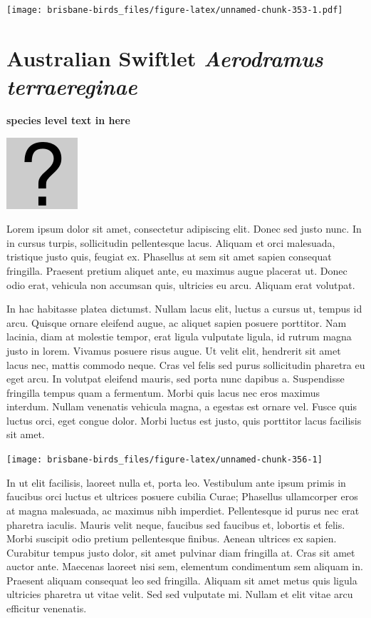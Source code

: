 \documentclass[]{book}
\let\origfigure\figure
\let\endorigfigure\endfigure
\renewenvironment{figure}[1][2] {
  \expandafter\origfigure\expandafter[H]
} {
  \endorigfigure
}
\begin{document}
\texttt{[image: brisbane-birds\_files/figure-latex/unnamed-chunk-353-1.pdf]}

\section{\texorpdfstring{Australian Swiftlet \emph{Aerodramus
terraereginae}}{Australian Swiftlet Aerodramus terraereginae}}\label{australian-swiftlet-aerodramus-terraereginae}

\textbf{species level text in here}

\begin{figure}
\centering
\includegraphics{assets/missing.png}
\caption{No image for species}
\end{figure}

Lorem ipsum dolor sit amet, consectetur adipiscing elit. Donec sed justo
nunc. In in cursus turpis, sollicitudin pellentesque lacus. Aliquam et
orci malesuada, tristique justo quis, feugiat ex. Phasellus at sem sit
amet sapien consequat fringilla. Praesent pretium aliquet ante, eu
maximus augue placerat ut. Donec odio erat, vehicula non accumsan quis,
ultricies eu arcu. Aliquam erat volutpat.

In hac habitasse platea dictumst. Nullam lacus elit, luctus a cursus ut,
tempus id arcu. Quisque ornare eleifend augue, ac aliquet sapien posuere
porttitor. Nam lacinia, diam at molestie tempor, erat ligula vulputate
ligula, id rutrum magna justo in lorem. Vivamus posuere risus augue. Ut
velit elit, hendrerit sit amet lacus nec, mattis commodo neque. Cras vel
felis sed purus sollicitudin pharetra eu eget arcu. In volutpat eleifend
mauris, sed porta nunc dapibus a. Suspendisse fringilla tempus quam a
fermentum. Morbi quis lacus nec eros maximus interdum. Nullam venenatis
vehicula magna, a egestas est ornare vel. Fusce quis luctus orci, eget
congue dolor. Morbi luctus est justo, quis porttitor lacus facilisis sit
amet.

\begin{figure}
\texttt{[image: brisbane-birds\_files/figure-latex/unnamed-chunk-356-1]} \caption{insert figure caption}\label{fig:unnamed-chunk-356}
\end{figure}

In ut elit facilisis, laoreet nulla et, porta leo. Vestibulum ante ipsum
primis in faucibus orci luctus et ultrices posuere cubilia Curae;
Phasellus ullamcorper eros at magna malesuada, ac maximus nibh
imperdiet. Pellentesque id purus nec erat pharetra iaculis. Mauris velit
neque, faucibus sed faucibus et, lobortis et felis. Morbi suscipit odio
pretium pellentesque finibus. Aenean ultrices ex sapien. Curabitur
tempus justo dolor, sit amet pulvinar diam fringilla at. Cras sit amet
auctor ante. Maecenas laoreet nisi sem, elementum condimentum sem
aliquam in. Praesent aliquam consequat leo sed fringilla. Aliquam sit
amet metus quis ligula ultricies pharetra ut vitae velit. Sed sed
vulputate mi. Nullam et elit vitae arcu efficitur venenatis.
\end{document}
